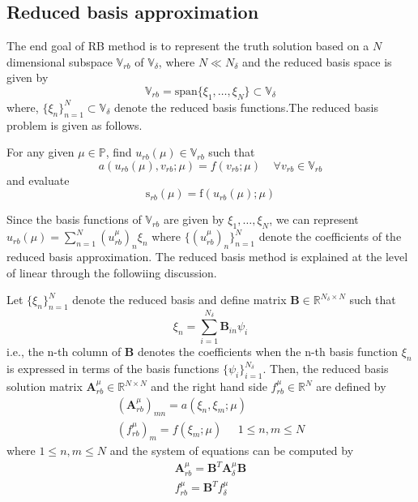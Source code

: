 \documentclass[11pt, oneside]{article}
\begin{document}
\subsection{Reduced basis approximation}
The end goal of RB method is to represent the truth solution based on a $N$ dimensional subspace $\mathbb{V}_{rb}$ of $\mathbb{V}_{\delta}$, where $N \ll N_{\delta}$ and the reduced basis space is given by
    \begin{equation}
      \mathbb{V}_{rb} = \text{span}\{\xi_1,\dots,\xi_N\} \subset \mathbb{V}_{\delta}
    \end{equation}
    where, $\{\xi_n\}_{n=1}^{N} \subset \mathbb{V}_{\delta}$ denote the reduced basis functions.The reduced basis problem is given as follows.

For any given $\mu \in \mathbb{P}$, find $u_{rb}(\mu) \in \mathbb{V}_{rb}$ such that
  \begin{equation}
        {a}(u_{rb}(\mu), v_{rb}; \mu) ={f}(v_{rb};\mu) \mspace{20mu} \forall v_{rb} \in \mathbb{V}_{rb}
  \end{equation}
and evaluate
  \begin{equation}
    \mathrm{s}_{rb}(\mu) = \mathrm{f}(u_{rb}(\mu);\mu)
  \end{equation}

Since the basis functions of $\mathbb{V}_{rb}$ are given by $\xi_1,\dots,\xi_N$, we can represent $u_{rb}(\mu) = \sum_{n=1}^{N}(u_{rb}^{\mu})_n \xi_n$ where $\{(u_{rb}^{\mu})_n\}_{n=1}^{N}$ denote the coefficients of the reduced basis approximation. The reduced basis method is explained at the level of linear through the followiing discussion.

Let $\{\xi_n\}_{n=1}^{N}$ denote the reduced basis and define matrix $\mathbf{B} \in \mathbb{R}^{N_{\delta} \times N}$ such that
    \begin{equation}
      \xi_n = \sum_{i=1}^{N_{\delta}} \mathbf{B}_{in} \psi_i
    \end{equation}
i.e., the n-th column of $\mathbf{B}$ denotes the coefficients when the n-th basis function $\xi_n$ is expressed in terms of the basis functions $\{\psi_i\}_{i=1}^{N_{\delta}}$. Then, the reduced basis solution matrix $\mathbf{A}_{rb}^{\mu} \in \mathbb{R}^{N \times N}$ and the right hand side $f_{rb}^{\mu} \in \mathbb{R}^{N}$ are defined by
    \begin{align}
      (\mathbf{A}_{rb}^{\mu})_{mn} = a(\xi_n, \xi_m; \mu) \\
      (f_{rb}^{\mu})_m = f(\xi_m;\mu) \mspace{25mu}  1\leq n,m \leq N
    \end{align}
where $ 1\leq n,m \leq N$ and the system of equations can be computed by
    \begin{align}
      \mathbf{A}_{rb}^{\mu} = \mathbf{B}^T \mathbf{A}_{\delta}^{\mu}\mathbf{B}\\
      f_{rb}^{\mu} = \mathbf{B}^T f_{\delta}^{\mu}
    \end{align}
\end{document}
